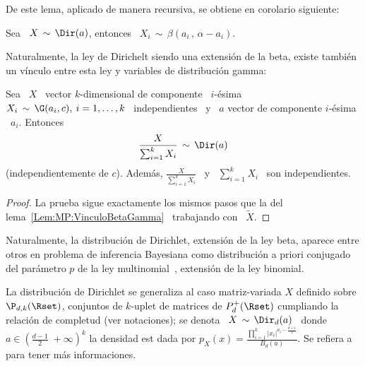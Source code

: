 De este lema, aplicado de manera recursiva, se obtiene en corolario siguiente:
%
\begin{corolario}
\label{Cor:MP:MarginalDirichletBeta}
%
  Sea  \ $X  \,  \sim \,  \Dir(a)$, entonces  \  $\displaystyle X_i  \, \sim  \,
  \beta\left( a_i \, , \, \alpha-a_i \right)$.
\end{corolario}

Naturalmente,  la ley de  Dirichelt siendo  una extensi\'on  de la  beta, existe
tambi\'en un v\'inculo entre esta ley y variables de distribuci\'on gamma:
%
\begin{lema}
\label{Lem:MP:VinculoDirichletGamma}
%
Sea \ $X$ \ vector $k$-dimensional de componente \ $i$-\'esima \ $X_i \, \sim \,
\G(a_i,c), \: i = 1, \ldots , k$ \ independientes \ y \ $a$ vector de componente
$i$-\'esima \ $a_i$. Entonces
  \[
  \frac{X}{\sum_{i=1}^k X_i} \, \sim \, \Dir(a)
  \]
  (independientemente  de $c$).   Adem\'as, $\frac{X}{\sum_{i=1}^k  X_i}$ \  y \
  $\sum_{i=1}^k X_i$ \ son independientes.
\end{lema}
%
\begin{proof}
  La    prueba   sigue    exactamente   los    mismos   pasos    que    la   del
  lema~\ref{Lem:MP:VinculoBetaGamma} \ trabajando con \ $\widetilde{X}$.
\end{proof}

Naturalmente,  la  distribuci\'on de  Dirichlet,  extensi\'on  de  la ley  beta,
aparece entre  otros en problema  de inferencia Bayesiana como  distribuci\'on a
priori  conjugado~\footref{Foot:MP:BayesPrior}  del  par\'ametro  $p$  de  la  ley
multinomial~\cite{Rob07}, extensi\'on de la ley binomial.



La distribuci\'on de Dirichlet se generaliza al caso matriz-variada $X$ definido
sobre $\P_{d,k}(\Rset)$,  conjuntos de  $k$-uplet de matrices  de $P_d^+(\Rset)$
cumpliando la relaci\'on  de completud (ver notaciones); se denota  \ $X \, \sim
\, \Dir_d(a)$  \ donde \  $a \in \left(  \frac{d-1}{2} \; +\infty  \right)^k$ la
densidad  est dada por  $\displaystyle p_X(x)  = \frac{\prod_{i=1}^k  \left| x_i
  \right|^{a_i-\frac{d+1}{2}}}{B_d(a)}$.   Se  refiera a~\cite[Cap.~6]{GupNag99}
para tener m\'as informaciones.